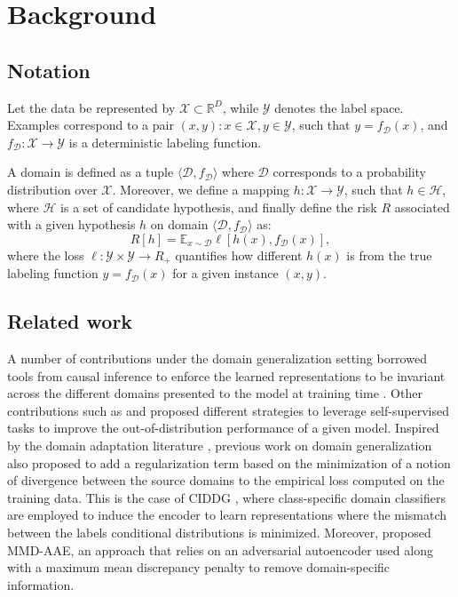 \documentclass{article}
\begin{document}
\section{Background}\label{sec:background}
\subsection{Notation}
Let the data be represented by $\mathcal{X} \subset \mathbb{R}^D$, while $\mathcal{Y}$ denotes the label space. Examples correspond to a pair $(x, y) : x \in \mathcal{X}, y \in \mathcal{Y}$, such that $y=f_{\mathcal{D}}(x)$, and $f_{\mathcal{D}}:\mathcal{X}\rightarrow\mathcal{Y}$ is a deterministic labeling function. 

A domain is defined as a tuple $\langle \mathcal{D}, f_{\mathcal{D}} \rangle$ where $\mathcal{D}$ corresponds to a probability distribution over $\mathcal{X}$. Moreover, we define a mapping $h:\mathcal{X}\rightarrow\mathcal{Y}$, such that $h \in \mathcal{H}$, where $\mathcal{H}$ is a set of candidate hypothesis, and finally define the risk $R$ associated with a given hypothesis $h$ on domain $\langle \mathcal{D}, f_{\mathcal{D}} \rangle$ as:
\begin{equation}
    R[h] = \mathbb{E}_{x \sim \mathcal{D}} \ell [h(x), f_\mathcal{D}(x)],
\end{equation}
where the loss $\ell:\mathcal{Y} \times \mathcal{Y} \rightarrow R_{+}$ quantifies how different $h(x)$ is from the true labeling function $y=f_{\mathcal{D}}(x)$ for a given instance $(x, y)$.

\subsection{Related work}\label{sec:rel_work}
A number of contributions under the domain generalization setting borrowed tools from causal inference to enforce the learned representations to be invariant across the different domains presented to the model at training time \cite{arjovsky2019invariant,mahajan2020domain,ahuja2020invariant}. Other contributions such as \cite{carlucci2019domain} and \cite{albuquerque2020improving} proposed different strategies to leverage self-supervised tasks to improve the out-of-distribution performance of a given model.
Inspired by the domain adaptation literature \cite{kifer2004detecting,ben2007analysis,ganin2016domain}, previous work on domain generalization also proposed to add a regularization term based on the minimization of a notion of divergence between the source domains to the empirical loss computed on the training data. This is the case of CIDDG \cite{li2018deep}, where class-specific domain classifiers are employed to induce the encoder to learn representations where the mismatch between the labels conditional distributions is minimized. Moreover, \cite{li2018domain} proposed MMD-AAE, an approach that relies on an adversarial autoencoder used along with a maximum mean discrepancy penalty \cite{gretton2012kernel} to remove domain-specific information. 
\end{document}
